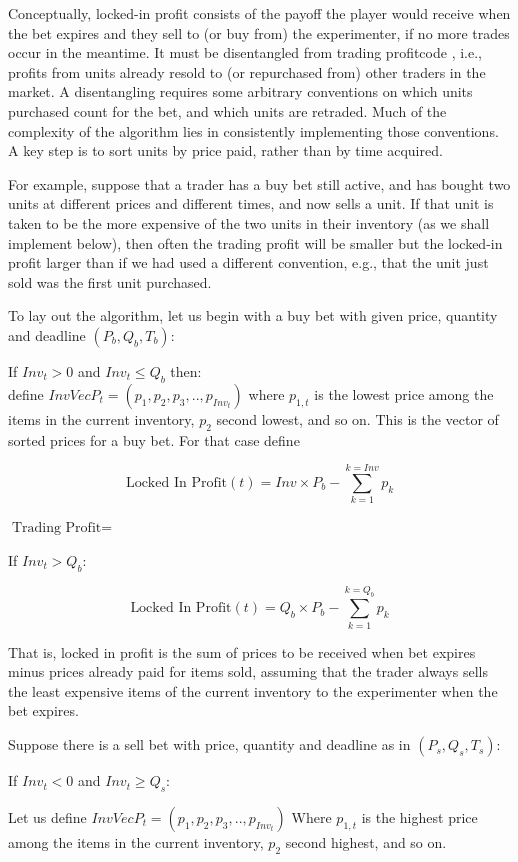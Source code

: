 \documentclass{article}
\begin{document}
Conceptually, locked-in profit consists of the payoff the player would receive when the bet expires and they sell to (or buy from) the experimenter, if no more trades occur in the meantime. 
It must be disentangled from trading profitcode , i.e., profits from units already resold to (or repurchased from) other traders in the market. 
A disentangling
 requires some arbitrary conventions on which units  purchased count for the bet, and which units are retraded. 
Much of the complexity of the algorithm lies in consistently implementing those conventions.
A key step is to sort units by price paid, rather than by time acquired.

For example, suppose that a trader has a buy bet still active, and has bought two units at different prices and different times, and now sells a unit. If that unit is taken to be the more expensive of the two units in their inventory (as we shall implement below), then often the trading profit will be smaller but the  locked-in profit  larger than if we had used a different  convention, e.g., that the unit just sold was the first unit purchased.

To lay out the algorithm, let us begin with
a buy bet with given price, quantity and deadline  $(P_b,Q_b,T_b)$:

If $Inv_t>0$ and $Inv_t \leq Q_b$ then:\\
define $InvVecP_t = (p_1,p_2,p_3,..,p_{Inv_t}) $
where $p_{1,t}$ is the lowest price among the items in the current inventory, $p_2$ second lowest, and so on. This is the vector of sorted prices for a buy bet.
For that case define
    
    $$\text{Locked In Profit}(t) = 
    Inv \times P_b - \sum_{k=1}^{k=Inv} p_k$$
    
    $\text{Trading Profit} = $

    
If $Inv_t > Q_b$:

    $$\text{Locked In Profit}(t) = 
    Q_b \times P_b - \sum_{k=1}^{k=Q_b} p_k$$

That is, locked in profit is the sum of prices to be received when bet expires minus prices already paid for items sold, assuming that the trader always sells  the least expensive items of the current inventory to the experimenter when the bet expires.

Suppose there is a sell bet with price, quantity and deadline as in $(P_s,Q_s,T_s)$:

If $Inv_t < 0$ and $Inv_t \geq Q_s$:

    Let us define $InvVecP_t = (p_1,p_2,p_3,..,p_{Inv_t}) $
    Where $p_{1,t}$ is the highest price among the items in the current inventory, $p_2$ second highest, and so on. 
    
\end{document}

